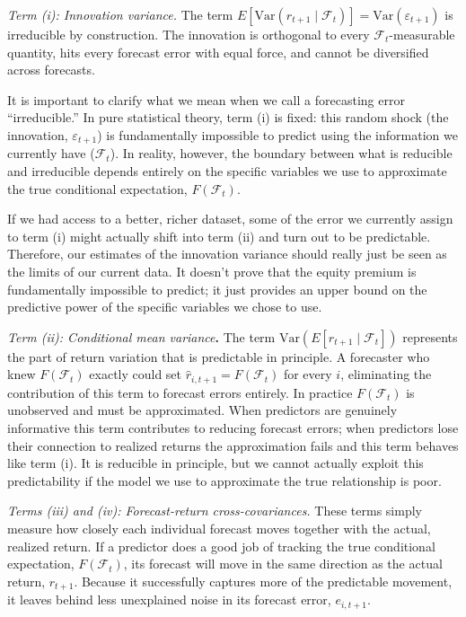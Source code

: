 \documentclass[a4paper,11pt]{article}
\begin{document}
\textit{Term (i): Innovation variance.} The term $E[\mathrm{Var}(r_{t+1} \mid \mathcal{F}_t)] = \mathrm{Var}(\varepsilon_{t+1})$ is irreducible by construction. The innovation is orthogonal to every $\mathcal{F}_t$-measurable quantity, hits every forecast error with equal force, and cannot be diversified across forecasts.

It is important to clarify what we mean when we call a forecasting error ``irreducible.'' In pure statistical theory, term (i) is fixed: this random shock (the innovation, $\varepsilon_{t+1}$) is fundamentally impossible to predict using the information we currently have ($\mathcal{F}_t$). In reality, however, the boundary between what is reducible and irreducible depends entirely on the specific variables we use to approximate the true conditional expectation, $F(\mathcal{F}_t)$. 

If we had access to a better, richer dataset, some of the error we currently assign to term (i) might actually shift into term (ii) and turn out to be predictable. Therefore, our estimates of the innovation variance should really just be seen as the limits of our current data. It doesn't prove that the equity premium is fundamentally impossible to predict; it just provides an upper bound on the predictive power of the specific variables we chose to use.

\textit{Term (ii): Conditional mean variance}\textbf{.} The term $\mathrm{Var}(E[r_{t+1} \mid \mathcal{F}_t])$ represents the part of return variation that is predictable in principle. A forecaster who knew $F(\mathcal{F}_t)$ exactly could set $\hat{r}_{i,t+1} = F(\mathcal{F}_t)$ for every $i$, eliminating the contribution of this term to forecast errors entirely. In practice $F(\mathcal{F}_t)$ is unobserved and must be approximated. When predictors are genuinely informative this term contributes to reducing forecast errors; when predictors lose their connection to realized returns the approximation fails and this term behaves like term (i). It is reducible in principle, but we cannot actually exploit this predictability if the model we use to approximate the true relationship is poor.

\textit{Terms (iii) and (iv): Forecast-return cross-covariances.} These terms simply measure how closely each individual forecast moves together with the actual, realized return. If a predictor does a good job of tracking the true conditional expectation, $F(\mathcal{F}_t)$, its forecast will move in the same direction as the actual return, $r_{t+1}$. Because it successfully captures more of the predictable movement, it leaves behind less unexplained noise in its forecast error, $e_{i,t+1}$.
\end{document}
